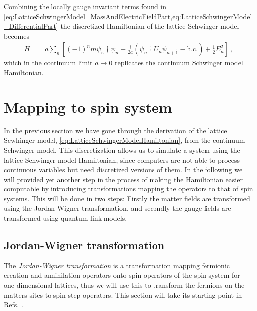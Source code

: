 \documentclass[../main.tex]{subfiles} %
\begin{document}
Combining the locally gauge invariant terms found in \cref{eq:LatticeSchwingerModel_MassAndElectricFieldPart,eq:LatticeSchwingerModel_DifferentialPart} the discretized Hamiltonian of the lattice Schwinger model becomes
\begin{align} \label{eq:LatticeSchwingerModelHamiltonian}
    H &= a \sum_n \left[ (-1)^n m \psi_n\dagger \psi_n - \frac{i}{2a}\left(\psi_n\dagger U_n\psi_{n+\hat{1}} - \mathrm{h.c.}\right) + \frac{1}{2}E_n^2 \right] \: ,
\end{align}
which in the continuum limit $a \rightarrow 0$ replicates the continuum Schwinger model Hamiltonian.




\section{Mapping to spin system}

In the previous section we have gone through the derivation of the lattice Scwhinger model, \cref{eq:LatticeSchwingerModelHamiltonian}, from the continuum Schwinger model. This discretization allows us to simulate a system using the lattice Schwinger model Hamiltonian, since computers are not able to process continuous variables but need discretized versions of them. In the following we will provided yet another step in the process of making the Hamiltonian easier computable by introducing transformations mapping the operators to that of spin systems. This will be done in two steps: Firstly the matter fields are transformed using the Jordan-Wigner transformation, and secondly the gauge fields are transformed using quantum link models.



\subsection{Jordan-Wigner transformation}

The \emph{Jordan-Wigner transformation} is a transformation mapping fermionic creation and annihilation operators onto spin operators of the spin-\half system for one-dimensional lattices, thus we will use this to transform the fermions on the matters sites to spin step operators. This section will take its starting point in Refs. \cite{jordan-wigner_1928, banksSusskindKogut_StrongCoupling_1976, panyella_masterThesis_2019}.
\end{document}
